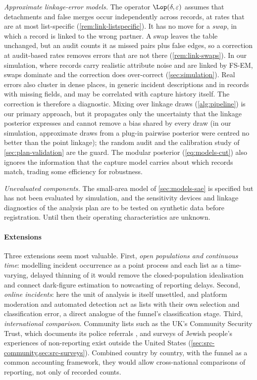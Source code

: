 \emph{Approximate linkage-error models.} The operator
$\Lop(\delta,\varepsilon)$ assumes that detachments and false merges occur
independently across records, at rates that are at most list-specific
(\cref{rem:link-listspecific}). It has no move for a \emph{swap}, in which a
record is linked to the wrong partner. A swap leaves the table unchanged,
but an audit counts it as missed pairs plus false edges, so a correction at
audit-based rates removes errors that are not there (\cref{rem:link-swaps}).
In our
simulation, where records carry realistic attribute noise and are linked by
FS-EM, swaps dominate and the correction does over-correct
(\cref{sec:simulation}). Real errors also cluster in dense places, in generic
incident descriptions and in records with missing fields, and may be
correlated with capture history itself. The correction is therefore a
diagnostic. Mixing over linkage draws (\cref{alg:pipeline}) is our primary
approach, but it propagates only the uncertainty that the linkage posterior
expresses and cannot remove a bias shared by every draw (in our simulation,
approximate draws from a plug-in pairwise posterior were centred no better
than the point linkage); the random audit
and the calibration study of \cref{sec:plan-validation} are the guard. The
modular posterior (\cref{eq:models-cut}) also ignores the information that
the capture model carries about which records match, trading some
efficiency for robustness.

\emph{Unevaluated components.} The small-area model of
\cref{sec:models-sae} is specified but has not been evaluated by simulation,
and the sensitivity devices and linkage diagnostics of the analysis plan are
to be tested on synthetic data before registration. Until then their
operating characteristics are unknown.

\paragraph{Extensions}
Three extensions seem most valuable. First, \emph{open populations and
continuous time}: modelling incident occurrence as a point process and each
list as a time-varying, delayed thinning of it would remove the
closed-population idealisation and connect dark-figure estimation to
nowcasting of reporting delays. Second, \emph{online incidents}: here the
unit of analysis is itself unsettled, and platform moderation and automated
detection act as lists with their own selection and classification error, a
direct analogue of the funnel's classification stage. Third,
\emph{international comparison}. Community lists such as the UK's
Community Security Trust, which documents its police referrals
\citep{cst2026incidents}, and surveys of Jewish people's experiences of
non-reporting \citep{fra2018antisemitism,fra2024antisemitism} exist outside
the United States (\cref{sec:src-community,sec:src-surveys}). Combined
country by country, with the funnel as a common accounting framework, they
would allow cross-national comparisons of reporting, not only of recorded
counts.


